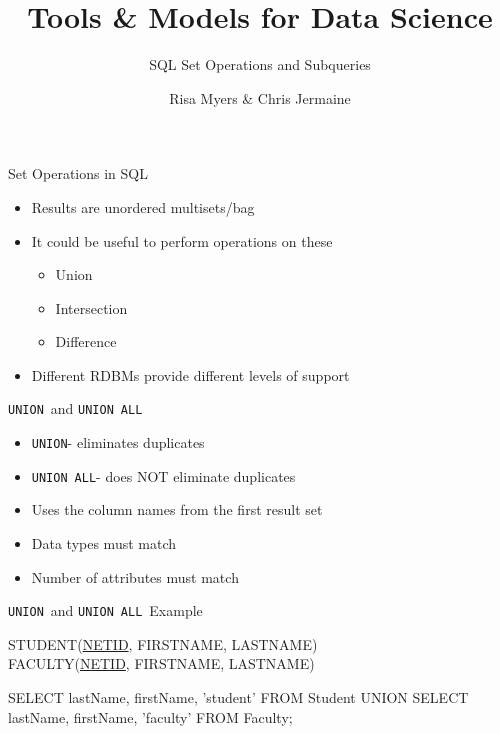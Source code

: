 \documentclass[aspectratio=169]{beamer}
\title[]
{Tools \& Models for Data Science}
\subtitle{SQL Set Operations and Subqueries}
\author[]{Risa Myers \& Chris Jermaine}
\institute
{
  Rice University
}
\date[]{}
\newcommand{\ALL}{\texttt{ALL}}
\newcommand{\UNION}{\texttt{UNION}}
\begin{document}
\begin{frame}
 \titlepage
\end{frame}


\begin{frame}{Set Operations in SQL}

\begin{itemize}
\item Results are unordered multisets/bag
\item It could be useful to perform operations on these 
\begin{itemize}
\item Union
\item Intersection
\item Difference
\end{itemize}
\item Different RDBMs provide different levels of support

\end{itemize}
\end{frame}


\begin{frame}{\UNION\ and \UNION\ \ALL}

\begin{itemize}
\item \UNION - eliminates duplicates
\item \UNION\ \ALL - does NOT eliminate duplicates
\item Uses the column names from the first result set
\item Data types must match
\item Number of attributes must match
\end{itemize}
\end{frame}

\begin{frame}[fragile]{\UNION\ and \UNION\ \ALL\ Example}

STUDENT(\underline{NETID}, FIRSTNAME, LASTNAME)\\
FACULTY(\underline{NETID}, FIRSTNAME, LASTNAME)

\begin{SQL}
SELECT lastName, firstName, 'student' 
FROM Student
UNION 
SELECT lastName, firstName, 'faculty' 
FROM Faculty;
\end{SQL}

\end{frame}
\end{document}
